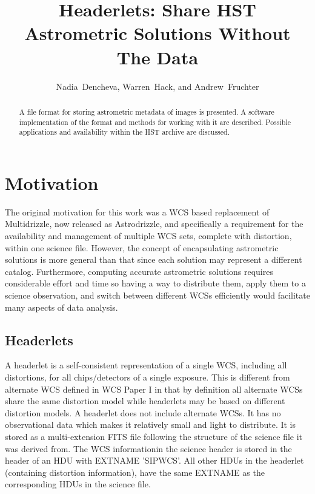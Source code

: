 
\resetcounters




\title{Headerlets: Share HST Astrometric Solutions Without The Data}
\author{Nadia~Dencheva, Warren~Hack, and Andrew~Fruchter
}


\begin{abstract}
A file format for storing astrometric metadata of images is presented. 
A software implementation of the format and methods for working with 
it are described. Possible applications and availability within 
the HST archive are discussed.
\end{abstract}

\section{Motivation}
The original motivation for this work was a WCS based replacement
of Multidrizzle, now released as Astrodrizzle, and specifically a
requirement for the availability and management of multiple WCS
sets, complete with distortion,
within one science file. However, the concept of encapsulating
astrometric solutions is more general than that since each solution
may represent a different catalog. Furthermore, computing accurate
astrometric solutions requires considerable effort and time so having
a way to distribute them, apply them to a science observation, and
switch between different WCSs efficiently would facilitate many
aspects of data analysis.

\subsection{Headerlets}
A headerlet is a self-consistent representation of a single WCS,
including all distortions, for all chips/detectors of a single
exposure. This is different from alternate WCS defined in WCS
Paper I \citep{greisen_2002} in that by definition
all alternate WCSs share the same distortion model while headerlets
may be based on different distortion models. A headerlet does not 
include alternate WCSs. It has no observational data
which makes it relatively small and light to distribute. 
It is stored as a multi-extension FITS file
following the structure of the science file it was derived from.
The WCS informationin the science header is stored in the header of 
an HDU with EXTNAME 'SIPWCS'. All other HDUs in the headerlet 
(containing distortion information), have the same EXTNAME as the 
corresponding HDUs in the science file.

